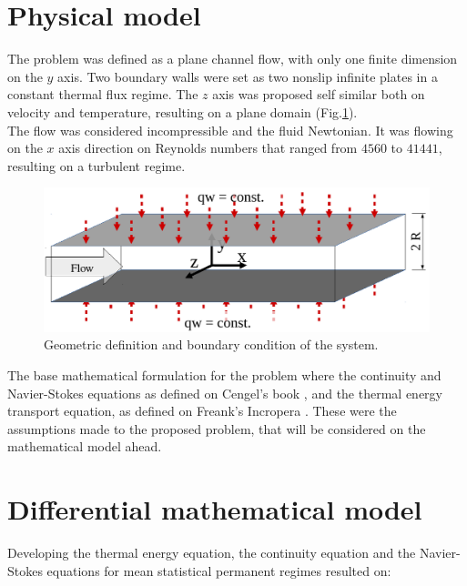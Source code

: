 \documentclass[10pt]{article} %
\begin{document}
\section{Physical model}

The problem was defined as a plane channel flow, with only one finite dimension on the $y$ axis. Two boundary walls were set as two nonslip infinite plates in a constant thermal flux regime. The $z$ axis was proposed self similar both on velocity and temperature, resulting on a plane domain (Fig.\ref{figure.1}). \\
The flow was considered incompressible and the fluid Newtonian. It was flowing on the $x$ axis direction on Reynolds numbers that ranged from $4560$ to $41441$, resulting on a turbulent regime. 

\begin{figure}[h!]
	\centering
	\includegraphics[angle=0, scale=0.50]{figure1}
	\caption{Geometric definition and boundary condition of the system.}
	\label{figure.1}
\end{figure}

The base mathematical formulation for the problem where the continuity and Navier-Stokes equations as defined on Cengel's book \cite{Cengel}, and the thermal energy transport equation, as defined on Freank's Incropera \cite{Incropera}. These were the assumptions made to the proposed problem, that will be considered on the mathematical model ahead.









\section{Differential mathematical model}

Developing the thermal energy equation, the continuity equation and the Navier-Stokes equations for mean statistical permanent regimes resulted on: 
\end{document}
